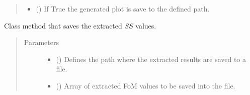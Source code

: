\documentclass[letterpaper,10pt,english,openany, oneside]{sphinxmanual}
\begin{document}
\begin{fulllineitems}
\begin{fulllineitems}
\begin{quote}
\begin{description}
\begin{itemize}
\item {} 
 () \textendash{} If True the generated plot is save to the defined path.

\end{itemize}

\end{description}\end{quote}

\end{fulllineitems}


\begin{fulllineitems}
\label{\detokenize{index:fompy.fom.ss_ext.save_results_to_file}}
Class method that saves the extracted \(SS\) values.
\begin{quote}\begin{description}
\item[{Parameters}] \leavevmode\begin{itemize}
\item {} 
 () \textendash{} Defines the path where the extracted results are saved to a file.

\item {} 
 () \textendash{} Array of extracted FoM values to be saved into the file.

\end{itemize}

\end{description}\end{quote}

\end{fulllineitems}


\end{fulllineitems}

\end{document}
